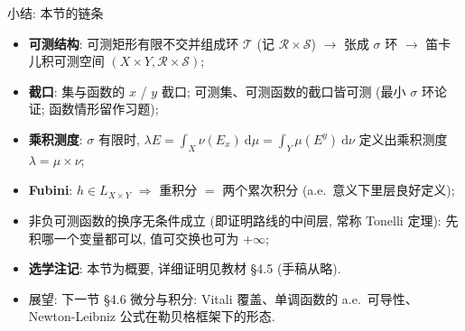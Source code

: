 \begin{frame}{小结: 本节的链条}

\begin{itemize}
\item \textbf{可测结构}: 可测矩形有限不交并组成环 $\mathscr{T}$
  (记 $\mathscr{R} \times \mathscr{S}$) $\to$ 张成 $\sigma$ 环
  $\to$ 笛卡儿积可测空间 $(X \times Y, \mathscr{R} \times \mathscr{S})$;
\item \textbf{截口}: 集与函数的 $x$ / $y$ 截口; 可测集、可测函数的截口皆可测
  (最小 $\sigma$ 环论证; 函数情形留作习题);
\item \textbf{乘积测度}: $\sigma$ 有限时, $\lambda E = \int_X \nu(E_x) ~ \mathrm{d}\mu
= \int_Y \mu(E^y) ~ \mathrm{d}\nu$ 定义出乘积测度 $\lambda = \mu \times \nu$;
\item \textbf{Fubini}: $h \in L_{X \times Y}$
$\Longrightarrow$ 重积分 $=$ 两个累次积分 (a.e.\ 意义下里层良好定义);
\graymode
\item 非负可测函数的换序\alert{无条件}成立 (即证明路线的中间层, 常称 Tonelli 定理):
  先积哪一个变量都可以, 值可交换也可为 $+\infty$;
\normalmode
\item \textbf{选学注记}: 本节为概要, 详细证明见教材 \S 4.5 (手稿从略).
\end{itemize}

\pause

\begin{itemize}
\item 展望: 下一节 \S 4.6 微分与积分: Vitali 覆盖、单调函数的 a.e.\ 可导性、
  Newton-Leibniz 公式在勒贝格框架下的形态.
\end{itemize}

\end{frame}



